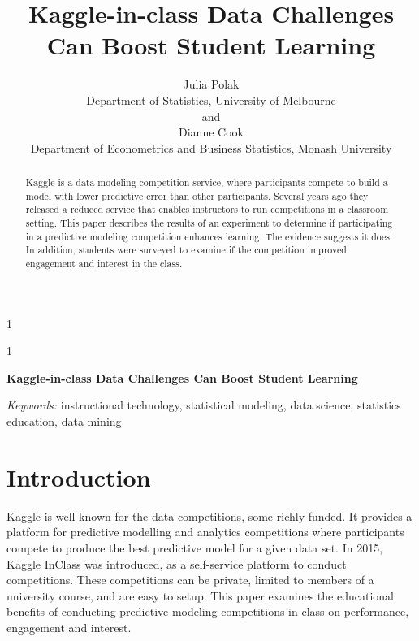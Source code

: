 \documentclass[12pt]{article}
\newcommand{\blind}{1}
\begin{document}
\def\spacingset#1{\renewcommand{\baselinestretch}%
{#1}\small\normalsize} \spacingset{1}



\blind
{
  \title{\bf Kaggle-in-class Data Challenges Can Boost Student Learning}

  \author{
        Julia Polak \\
    Department of Statistics, University of Melbourne\\
     and \\     Dianne Cook \\
    Department of Econometrics and Business Statistics, Monash University\\
      }
  \maketitle
} \fi

\blind
{
  \bigskip
  \bigskip
  \bigskip
  \begin{center}
    {\LARGE\bf Kaggle-in-class Data Challenges Can Boost Student Learning}
  \end{center}
  \medskip
} \fi

\bigskip
\begin{abstract}
Kaggle is a data modeling competition service, where participants
compete to build a model with lower predictive error than other
participants. Several years ago they released a reduced service that
enables instructors to run competitions in a classroom setting. This
paper describes the results of an experiment to determine if
participating in a predictive modeling competition enhances learning.
The evidence suggests it does. In addition, students were surveyed to
examine if the competition improved engagement and interest in the
class.
\end{abstract}

\noindent%
{\it Keywords:} instructional technology, statistical modeling, data science, statistics education, data mining
\vfill

\newpage
\spacingset{1.45} %

\section{Introduction}\label{introduction}

Kaggle \citep{kaggle} is well-known for the data competitions, some
richly funded. It provides a platform for predictive modelling and
analytics competitions where participants compete to produce the best
predictive model for a given data set. In 2015, Kaggle InClass was
introduced, as a self-service platform to conduct competitions. These
competitions can be private, limited to members of a university course,
and are easy to setup. This paper examines the educational benefits of
conducting predictive modeling competitions in class on performance,
engagement and interest.
\end{document}
